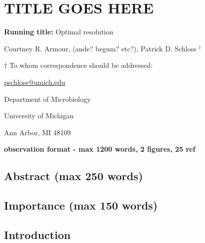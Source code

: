 \documentclass[
]{article}
\author{}
\date{\vspace{-2.5em}}
\begin{document}
\hypertarget{title-goes-here}{%
\section{TITLE GOES HERE}\label{title-goes-here}}

\vspace{20mm}

\textbf{Running title:} Optimal resolution

\vspace{10mm}

Courtney R. Armour, (ande? begum? etc?), Patrick D. Schloss
\({^\dagger}\)

\vspace{20mm}

\({\dagger}\) To whom correspondence should be addressed:

\href{mailto:pschloss@umich.edu}{pschloss@umich.edu}

Department of Microbiology

University of Michigan

Ann Arbor, MI 48109

\vspace{20mm}

\textbf{observation format - max 1200 words, 2 figures, 25 ref}

\newpage

\hypertarget{abstract-max-250-words}{%
\subsection{Abstract (max 250 words)}\label{abstract-max-250-words}}

\hypertarget{importance-max-150-words}{%
\subsection{Importance (max 150 words)}\label{importance-max-150-words}}

\newpage

\hypertarget{introduction}{%
\subsection{Introduction}\label{introduction}}
\end{document}
